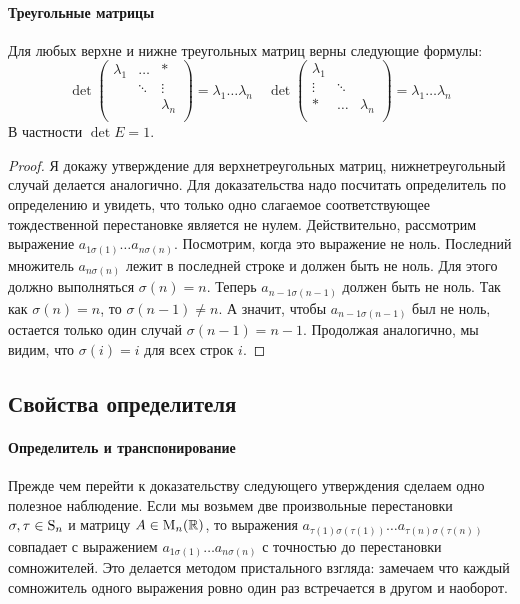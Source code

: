 \paragraph{Треугольные матрицы}

\begin{claim}
\label{claim::DetUpperTr}
Для любых верхне и нижне треугольных матриц верны следующие формулы:
\[
\det
\begin{pmatrix}
{\lambda_1}&{\ldots}&{*}\\
{}&{\ddots}&{\vdots}\\
{}&{}&{\lambda_n}\\
\end{pmatrix}
 = 
\lambda_1 \ldots \lambda_n
\quad
\det
\begin{pmatrix}
{\lambda_1}&{}&{}\\
{\vdots}&{\ddots}&{}\\
{*}&{\ldots}&{\lambda_n}\\
\end{pmatrix}
 = 
 \lambda_1 \ldots \lambda_n
\]
В частности $\det E = 1$.
\end{claim}
\begin{proof}
Я докажу утверждение для верхнетреугольных матриц, нижнетреугольный случай делается аналогично.
Для доказательства надо посчитать определитель по определению и увидеть, что только одно слагаемое соответствующее тождественной перестановке является не нулем.
Действительно, рассмотрим выражение $a_{1\sigma(1)}\ldots a_{n\sigma(n)}$.
Посмотрим, когда это выражение не ноль.
Последний множитель $a_{n\sigma(n)}$ лежит в последней строке и должен быть не ноль.
Для этого должно выполняться $\sigma(n) = n$.
Теперь $a_{n-1\sigma(n-1)}$ должен быть не ноль.
Так как $\sigma(n) = n$, то $\sigma(n - 1)\neq n$.
А значит, чтобы $a_{n-1 \sigma(n-1)}$ был не ноль, остается только один случай $\sigma(n-1) = n-1$.
Продолжая аналогично, мы видим, что $\sigma(i) = i$ для всех строк $i$.
\end{proof}


\subsection{Свойства определителя}

\paragraph{Определитель и транспонирование}

Прежде чем перейти к доказательству следующего утверждения сделаем одно полезное наблюдение.
Если мы возьмем две произвольные перестановки $\sigma,\tau\in\operatorname{S}_{n}$ и матрицу $A\in\operatorname{M}_{n}(\mathbb R)$, то выражения $a_{\tau(1) \sigma(\tau (1))}\ldots a_{\tau(n) \sigma(\tau(n))}$ совпадает с выражением $a_{1\sigma(1)}\ldots a_{n\sigma(n)}$ с точностью до перестановки сомножителей.
Это делается методом пристального взгляда: замечаем что каждый сомножитель одного выражения ровно один раз встречается в другом и наоборот.

